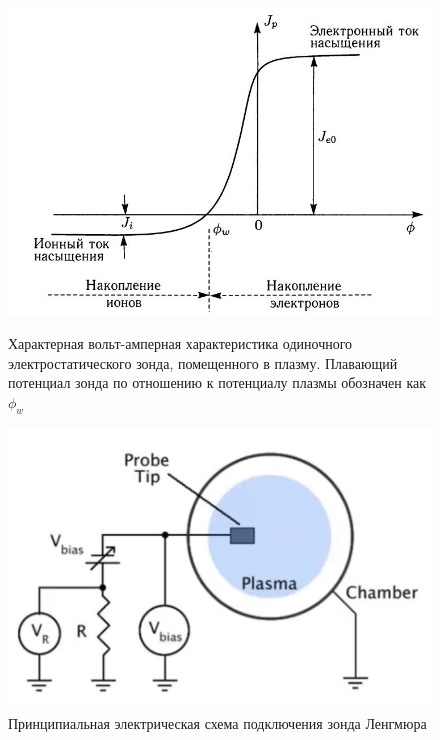 \documentclass[10pt, a4paper]{article}
\begin{document}
\begin{figure}[ht]
	\begin{center}
		\begin{minipage}[ht]{0.49\linewidth}
			\includegraphics[width=1\linewidth]{VaH_zonda.JPG}
			\caption{Характерная вольт-амперная характеристика одиночного электростатического зонда, помещенного в плазму. Плавающий потенциал зонда по отношению к потенциалу плазмы обозначен как $\phi_w$}
			\label{fig:Langmuir_probe}
		\end{minipage}
		\hfill
		\begin{minipage}[ht]{0.49\linewidth}
			\includegraphics[width=1\linewidth]{Langmuir_probe_scheme}
			\caption{Принципиальная электрическая схема подключения зонда Ленгмюра}
			\label{fig:Langmuir_probe_scheme}
		\end{minipage}
	\end{center}
\end{figure}
\end{document}
